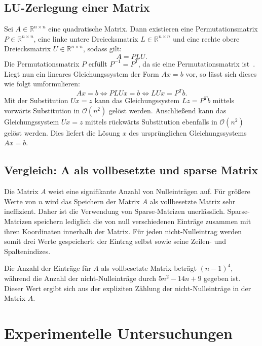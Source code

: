 \documentclass{scrartcl}
\newcommand\R{\mathbb{R}}
\newcommand\BigO{\mathcal{O}}
\begin{document}
\subsection{LU-Zerlegung einer Matrix}

Sei \(A \in \R^{n \times n}\) eine quadratische Matrix. Dann existieren eine
Permutationsmatrix \(P \in \R^{n \times n}\), eine linke untere Dreiecksmatrix
\(L \in \R^{n \times n}\) und eine rechte obere Dreiecksmatrix \(U \in \R^{n
\times n}\), sodass gilt:
\[
    A = PLU.
\]
Die Permutationsmatrix \(P\) erfüllt \(P^{-1} = P^T\), da sie eine
  Permutationsmatrix ist~\cite{LU}. Liegt nun ein lineares Gleichungssystem der
  Form \(Ax = b\) vor, so lässt sich dieses wie folgt umformulieren:
\[
    Ax = b \iff PLUx = b \iff LUx = P^T b.
\]
Mit der Substitution \(Ux = z\) kann das Gleichungssystem \(Lz = P^T b\)
  mittels vorwärts Substitution in \(\BigO(n^2)\) gelöst werden. Anschließend
  kann das Gleichungssystem \(Ux = z\) mittels rückwärts Substitution ebenfalls
  in \(\BigO(n^2)\) gelöst werden. Dies liefert die Lösung \(x\) des
  ursprünglichen Gleichungssystems \(Ax = b\).

\subsection{Vergleich: A als vollbesetzte und sparse Matrix}

Die Matrix \(A\) weist eine signifikante Anzahl von Nulleinträgen auf. Für
größere Werte von \(n\) wird das Speichern der Matrix \(A\) als vollbesetzte
Matrix sehr ineffizient. Daher ist die Verwendung von Sparse-Matrizen
unerlässlich. Sparse-Matrizen speichern lediglich die von null verschiedenen
Einträge zusammen mit ihren Koordinaten innerhalb der Matrix. Für jeden
nicht-Nulleintrag werden somit drei Werte gespeichert: der Eintrag selbst sowie
seine Zeilen- und Spaltenindizes.

Die Anzahl der Einträge für \(A\) als vollbesetzte Matrix beträgt \({(n -
1)}^4\), während die Anzahl der nicht-Nulleinträge durch \(5n^2 - 14n + 9\)
gegeben ist. Dieser Wert ergibt sich aus der expliziten Zählung der
nicht-Nulleinträge in der Matrix \(A\).

\pagebreak

\section{Experimentelle Untersuchungen}
\end{document}
